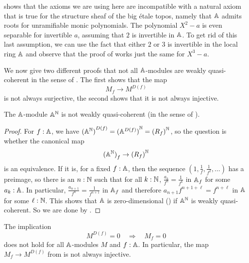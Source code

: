 \begin{remark}
   shows that
  the axioms we are using here
  are incompatible with a natural axiom that is true
  for the structure sheaf of the big étale topos,
  namely that $\mathbb{A}$ admits roots for unramifiable monic polynomials.
  The polynomial $X^2 - a$ is even separable for invertible $a$,
  assuming that $2$ is invertible in $\mathbb{A}$.
  To get rid of this last assumption,
  we can use the fact that either $2$ or $3$ is invertible in the local ring $\mathbb{A}$
  and observe that the proof of 
  works just the same for $X^3 - a$.
\end{remark}

We now give two different proofs that not all $\mathbb{A}$-modules are weakly quasi-coherent
in the sense of .
The first shows that the map
\[ M_f \to M^{D(f)} \]
is not always surjective,
the second shows that it is not always injective.

\begin{proposition}%
  \label{RN-non-wqc}
  The $\mathbb{A}$-module $\mathbb{A}^{\mathbb{N}}$ is not weakly quasi-coherent
  (in the sense of ).
\end{proposition}

\begin{proof}
  For $f : \mathbb{A}$,
  we have ${(\mathbb{A}^{\mathbb{N}})}^{D(f)} = {(\mathbb{A}^{D(f)})}^{\mathbb{N}} = {(R_f)}^{\mathbb{N}}$,
  so the question is whether the canonical map
  \[ {(\mathbb{A}^{\mathbb{N}})}_f \to {(R_f)}^{\mathbb{N}} \]
  is an equivalence.
  If it is,
  for a fixed $f : \mathbb{A}$,
  then the sequence $(1, \frac{1}{f}, \frac{1}{f^2}, \dots)$
  has a preimage,
  so there is an $n : \mathbb{N}$ such that
  for all $k : \mathbb{N}$,
  $\frac{a_k}{f^n} = \frac{1}{f^k}$ in $\mathbb{A}_f$
  for some $a_k : \mathbb{A}$.
  In particular, $\frac{a_{n+1}}{f^n} = \frac{1}{f^{n+1}}$ in $\mathbb{A}_f$
  and therefore $a_{n+1} f^{n+1+\ell} = f^{n+\ell}$ in $\mathbb{A}$ for some $\ell : \mathbb{N}$.
  This shows that $\mathbb{A}$ is zero-dimensional
  ()
  if $\mathbb{A}^{\mathbb{N}}$ is weakly quasi-coherent.
  So we are done by .
\end{proof}

\begin{proposition}%
  \label{non-wqc-module-family}
  The implication
  \[ M^{D(f)} = 0 \quad\Rightarrow\quad M_f = 0 \]
  does not hold for all $\mathbb{A}$-modules $M$ and $f : \mathbb{A}$.
  In particular,
  the map $M_f \to M^{D(f)}$ from 
  is not always injective.
\end{proposition}

